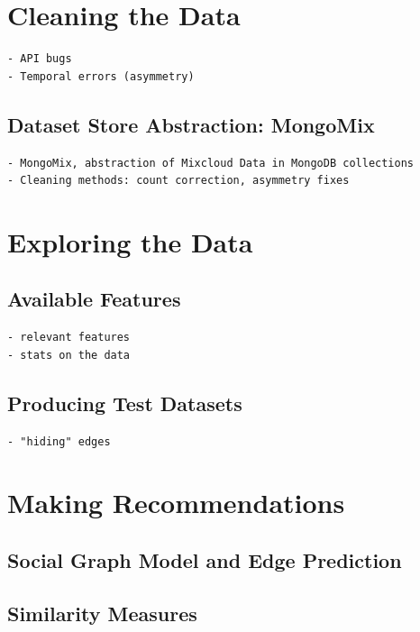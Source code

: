 \documentclass[a4paper,12pt,twoside,notitlepage]{report}
\begin{document}
\section{Cleaning the Data}

\begin{verbatim}
- API bugs
- Temporal errors (asymmetry)
\end{verbatim}

\subsection{Dataset Store Abstraction: MongoMix}


\begin{verbatim}
- MongoMix, abstraction of Mixcloud Data in MongoDB collections
- Cleaning methods: count correction, asymmetry fixes
\end{verbatim}

\section{Exploring the Data}

\subsection{Available Features}
\begin{verbatim}
- relevant features
- stats on the data
\end{verbatim}

\subsection{Producing Test Datasets}
\begin{verbatim}
- "hiding" edges
\end{verbatim}

\section{Making Recommendations}

\subsection{Social Graph Model and Edge Prediction}

\subsection{Similarity Measures}
\end{document}
